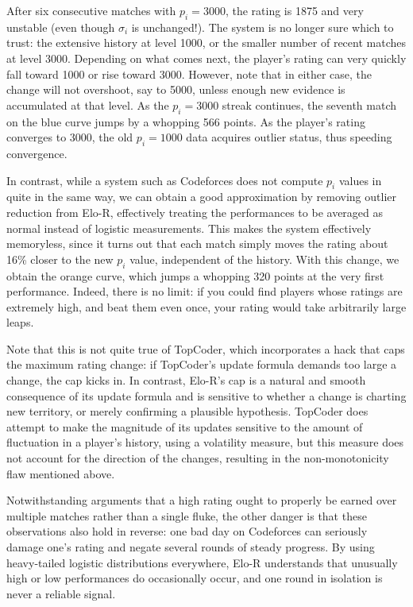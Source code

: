 \documentclass{article}
\begin{document}
After six consecutive matches with $p_i = 3000$, the rating is 1875 and very unstable (even though $\sigma_i$ is unchanged!). The system is no longer sure which to trust: the extensive history at level 1000, or the smaller number of recent matches at level 3000. Depending on what comes next, the player's rating can very quickly fall toward 1000 or rise toward 3000. However, note that in either case, the change will not overshoot, say to 5000, unless enough new evidence is accumulated at that level. As the $p_i=3000$ streak continues, the seventh match on the blue curve jumps by a whopping 566 points. As the player's rating converges to 3000, the old $p_i = 1000$ data acquires outlier status, thus speeding convergence.

In contrast, while a system such as Codeforces does not compute $p_i$ values in quite in the same way, we can obtain a good approximation by removing outlier reduction from Elo-R, effectively treating the performances to be averaged as normal instead of logistic measurements. This makes the system effectively memoryless, since it turns out that each match simply moves the rating about 16\% closer to the new $p_i$ value, independent of the history. With this change, we obtain the orange curve, which jumps a whopping 320 points at the very first performance. Indeed, there is no limit: if you could find players whose ratings are extremely high, and beat them even once, your rating would take arbitrarily large leaps.

Note that this is not quite true of TopCoder, which incorporates a hack that caps the maximum rating change: if TopCoder's update formula demands too large a change, the cap kicks in. In contrast, Elo-R's cap is a natural and smooth consequence of its update formula and is sensitive to whether a change is charting new territory, or merely confirming a plausible hypothesis. TopCoder does attempt to make the magnitude of its updates sensitive to the amount of fluctuation in a player's history, using a volatility measure, but this measure does not account for the direction of the changes, resulting in the non-monotonicity flaw mentioned above.

Notwithstanding arguments that a high rating ought to properly be earned over multiple matches rather than a single fluke, the other danger is that these observations also hold in reverse: one bad day on Codeforces can seriously damage one's rating and negate several rounds of steady progress. By using heavy-tailed logistic distributions everywhere, Elo-R understands that unusually high or low performances do occasionally occur, and one round in isolation is never a reliable signal.
\end{document}
